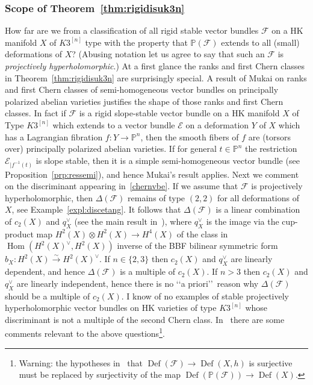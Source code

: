 \documentclass[11pt]{amsart}
\newcommand{\PP}{{\mathbb P}}
\let\mathcal\mathscr
\def\cE{\mathcal{E}}
\def\cF{\mathcal{F}}
\DeclareMathOperator{\Def}{Def}
\DeclareMathOperator{\Hom}{Hom}
\theoremstyle{definition}
\theoremstyle{remark}
\begin{document}
\subsubsection{Scope of Theorem~\ref{thm:rigidisuk3n}}
%
How far are we from a classification of all rigid stable vector bundles $\cF$ on a HK manifold $X$ of $K3^{[n]}$ type with the property that 
$\PP(\cF)$ extends to all (small) deformations of $X$? (Abusing notation let us agree to say that such an $\cF$ is 
\emph{projectively hyperholomorphic}.)
 At a first glance the ranks and first Chern classes  in Theorem~\ref{thm:rigidisuk3n} are surprisingly special. A result of Mukai\cite[Cor.~7.12]{muksemi}  on ranks and first Chern classes of semi-homogeneous vector bundles on principally polarized abelian varieties justifies the shape of those ranks and first Chern classes. In fact if $\cF$ is a rigid  slope-stable vector bundle on a HK manifold $X$ of Type $K3^{[n]}$ which extends to a vector bundle $\cE$ on a  deformation $Y$ of $X$ which has a Lagrangian fibration $f\colon Y\to\PP^n$, then the smooth fibers of $f$ are (torsors over) principally polarized abelian varieties. If for general $t\in\PP^n$ the restriction $\cE_{|f^{-1}(t)}$ is slope stable, then it is a simple semi-homogeneous vector bundle 
(see Proposition~\ref{prp:ressemi}), and hence Mukai's result applies. Next we comment on the discriminant
appearing in~\eqref{chernvbe}. If we assume that $\cF$ is projectively hyperholomorphic, then  $\Delta(\cF)$ remains of type $(2,2)$ for all deformations of $X$, see Example~\ref{expl:discetang}. It follows that
 $\Delta(\cF)$ is a  linear combination of $c_2(X)$ and $q_X^{\vee}$ (see  the main result in~\cite{zhang-char-form}), where $q_X^{\vee}$ is the image via the cup-product map $H^2(X)\otimes H^2(X)\to H^4(X)$ of the class in $\Hom(H^2(X)^{\vee},H^2(X))$ inverse of the BBF bilinear symmetric form $b_X\colon H^2(X)\xrightarrow{\sim} H^2(X)^{\vee}$.
   If $n\in\{2,3\}$ then $c_2(X)$ and $q_X^{\vee}$ are linearly dependent, and hence  $\Delta(\cF)$ is  a multiple of $c_2(X)$.  If $n>3$ then $c_2(X)$ and $q_X^{\vee}$ are linearly independent, hence there is no  \lq\lq a priori\rq\rq\  reason why  $\Delta(\cF)$ should be   a multiple of $c_2(X)$.  I know of no examples of stable projectively hyperholomorphic  vector bundles on HK varieties of type $K3^{[n]}$ whose discriminant is not a multiple of the second Chern class.
 In~\cite[Subsec.~1.3.2]{og:fascik3n} there are some comments relevant to the above questions\footnote{Warning: the hypotheses in~\cite[Prop.~1.2]{og:fascik3n} that $\Def(\cF)\to\Def(X,h)$ is surjective must be replaced 
by   surjectivity of the map $\Def(\PP(\cF))\to\Def(X)$.}.
\end{document}
